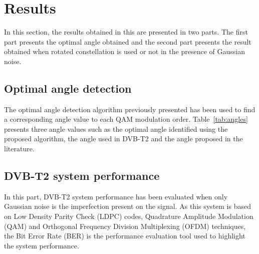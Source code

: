 \section{Results}
In this section, the results obtained in this are
presented in two parts. The first part presents
the optimal angle obtained and the second part
presents the result obtained when rotated
constellation is used or not in the presence of
Gaussian noise.
\subsection{Optimal angle detection}

The optimal angle detection algorithm previously
presented has been used to find a corresponding
angle value to each QAM modulation order.
Table~\ref{tab:angles} presents three angle
values such as the optimal angle identified
using the proposed algorithm, the angle used
in DVB-T2 and the angle proposed in the
literature.

\begin{table}[t]
    \centering
    \caption{Comparison of the angles adopted by
    the DVB-T2 standard to those proposed.}
    \label{tab:angles}

    \renewcommand{\arraystretch}{1.15}
\end{table}


\subsection{DVB-T2 system performance}

In this part, DVB-T2 system performance has been evaluated
when only Gaussian noise is the imperfection present on
the signal. As this system is based on Low Density Parity
Check (LDPC) codes, Quadrature Amplitude Modulation (QAM)
and Orthogonal Frequency Division Multiplexing (OFDM)
techniques, the Bit Error Rate (BER) is the performance
evaluation tool used to highlight the system performance.

